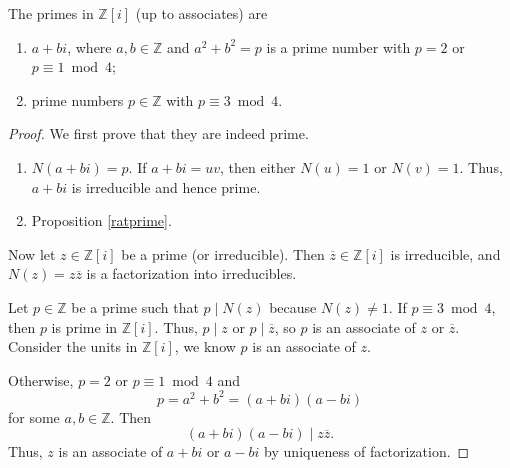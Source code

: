 \begin{theorem}{}{}
    \label{ziprime}
    The primes in \(\mathbb{Z}[i]\) (up to associates) are
    \begin{enumerate}
        \item \(a + bi\), where \(a, b \in \mathbb{Z}\) and \(a^2 + b^2 = p\) is a prime number with \(p = 2\) or \(p \equiv 1 \bmod 4\);
        \item prime numbers \(p \in \mathbb{Z}\) with \(p \equiv 3 \bmod 4\).
    \end{enumerate}
\end{theorem}
\begin{proof}
    We first prove that they are indeed prime.
    \begin{enumerate}
        \item \(N(a + bi) = p\). If \(a + bi = uv\), then either \(N(u) = 1\) or \(N(v) = 1\). Thus, \(a + bi\) is irreducible and hence prime.
        \item Proposition \eqref{ratprime}.
    \end{enumerate}
    Now let \(z \in \mathbb{Z}[i]\) be a prime (or irreducible). Then \(\overline{z} \in \mathbb{Z}[i]\) is irreducible, and \(N(z) = z \overline{z}\) is a factorization into irreducibles.

    Let \(p \in \mathbb{Z}\) be a prime such that \(p \mid N(z)\) because \(N(z) \neq 1\). If \(p \equiv 3 \bmod 4\), then \(p\) is prime in \(\mathbb{Z}[i]\). Thus, \(p \mid z\) or \(p \mid \overline{z}\), so \(p\) is an associate of \(z\) or \(\overline{z}\). Consider the units in \(\mathbb{Z}[i]\), we know \(p\) is an associate of \(z\).

    Otherwise, \(p = 2\) or \(p \equiv 1 \bmod 4\) and
    \[
        p = a^2 + b^2 = (a + bi)(a - bi)
    \]
    for some \(a, b \in \mathbb{Z}\). Then
    \[
        (a + bi)(a - bi) \mid z \overline{z}.
    \]
    Thus, \(z\) is an associate of \(a + bi\) or \(a - bi\) by uniqueness of factorization.
\end{proof}
